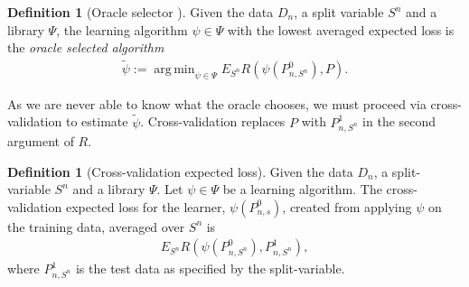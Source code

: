 \documentclass[11pt, a4paper]{article}
\DeclareMathOperator*{\argmin}{arg\,min}
\theoremstyle{definition}
\newtheorem{definition}[theorem]{Definition}
\theoremstyle{remark}
\newcommand{\la}{\psi}
\newcommand{\Sn}{S^n}
\newcommand{\lib}{\Psi}
\begin{document}
\begin{definition}[Oracle selector \parencite{laan03}]
    Given the data $ D_n $, a split variable $ \Sn $ and a library $ \lib $, the learning algorithm $ \la \in \lib $ with the lowest averaged expected loss is the \textit{oracle selected algorithm}
    \begin{align*}
        \tilde{\la} := \argmin_{\la \in \lib} E_{\Sn} R(\la(P_{n,\Sn}^0 ) , P).
    \end{align*}
\end{definition}
As we are never able to know what the oracle chooses, we must proceed via cross-validation to estimate $ \tilde{\la}  $. Cross-validation replaces $ P $ with $ P_{n, \Sn}^{1} $ in the second argument of $ R $.
\begin{definition}[Cross-validation expected loss]
     Given the data $D_n$, a split-variable $\Sn$ and a library $ \lib $. Let $ \la \in \lib $ be a learning algorithm. The cross-validation expected loss for the learner, $\la(P_{n,s}^0)$, created from applying $ \la $ on the training data, averaged over $ \Sn $ is  
    \begin{align*}
        E_{\Sn} R( \la(P_{n,\Sn}^{0}), P_{n, \Sn}^{1}),
    \end{align*}
    where $ P_{n,\Sn}^{1} $ is the test data as specified by the split-variable.
\end{definition}
\end{document}
